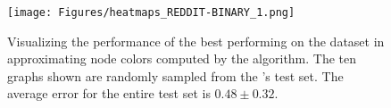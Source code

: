 \begin{figure}[H]
\begin{minipage}[b]{0.45992852703\textwidth}
    \end{minipage}
    \hfill
    \begin{minipage}[b]{0.53007147296\textwidth}
        \texttt{[image: Figures/heatmaps\_REDDIT-BINARY\_1.png]}
    \end{minipage}
    \hfill
    \caption{Visualizing the performance of the best performing \gnn on the \reddit dataset in approximating node colors computed by the \wl algorithm. The ten graphs shown are randomly sampled from the \gnn's test set. The average error for the entire test set is $0.48 \pm 0.32$.}
    \label{fig:gnn_approx_reddit}
\end{figure}
\clearpage

